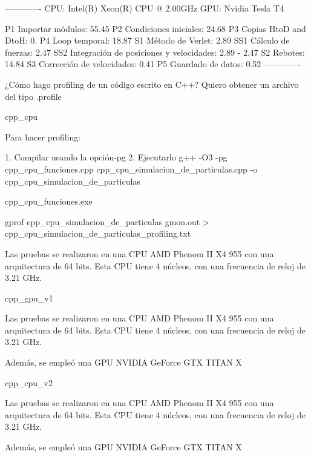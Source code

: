 \documentclass[aps,prb,twocolumn,superscriptaddress,floatfix,longbibliography]{revtex4-2}
\begin{document}
\begin{itemize}
-------------
CPU: Intel(R) Xeon(R) CPU @ 2.00GHz
GPU: Nvidia Tesla T4

P1 Importar módulos: 55.45
P2 Condiciones iniciales: 24.68
P3 Copias HtoD and DtoH: 0.
P4 Loop temporal: 18.87
S1 Método de Verlet: 2.89
SS1 Cálculo de fuerzas: 2.47
SS2 Integración de posiciones y velocidades: 2.89 - 2.47
S2 Rebotes: 14.84
S3 Corrección de velocidades: 0.41
P5 Guardado de datos: 0.52
-------------

¿Cómo hago profiling de un código escrito en C++? Quiero obtener un archivo del tipo .profile



cpp_cpu

Para hacer profiling:

1. Compilar usando la opción-pg
2. Ejecutarlo
g++ -O3 -pg cpp_cpu_funciones.cpp cpp_cpu_simulacion_de_particulas.cpp -o cpp_cpu_simulacion_de_particulas

cpp_cpu_funciones.exe

gprof cpp_cpu_simulacion_de_particulas gmon.out > cpp_cpu_simulacion_de_particulas_profiling.txt


Las pruebas se realizaron en una CPU AMD Phenom II X4 955 con una arquitectura de 64 bits. Esta CPU tiene 4 núcleos, con una frecuencia de reloj de 3.21 GHz.


cpp_gpu_v1

Las pruebas se realizaron en una CPU AMD Phenom II X4 955 con una arquitectura de 64 bits. Esta CPU tiene 4 núcleos, con una frecuencia de reloj de 3.21 GHz.

Además, se empleó una GPU NVIDIA GeForce GTX TITAN X





cpp_cpu_v2

Las pruebas se realizaron en una CPU AMD Phenom II X4 955 con una arquitectura de 64 bits. Esta CPU tiene 4 núcleos, con una frecuencia de reloj de 3.21 GHz.

Además, se empleó una GPU NVIDIA GeForce GTX TITAN X


\end{itemize}
\end{document}
